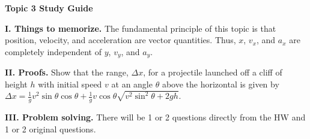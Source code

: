 \documentclass[11pt]{article}
\begin{document}
{\centering
\textbf{Topic 3 Study Guide} \par
\vspace{\baselineskip}
}

\textbf{I. Things to memorize.}
The fundamental principle of this topic is that position, velocity, and acceleration are vector quantities.
Thus, $x$, $v_x$, and $a_x$ are completely independent of $y$, $v_y$, and $a_y$.


\vspace{\baselineskip}
\textbf{II. Proofs.}
Show that the range, $\Delta x$, for a projectile launched off a cliff of height $h$ with initial speed $v$ at an angle $\theta$ above the horizontal is given by
$\Delta x = \frac{1}{g} v^2 \sin\theta \cos\theta + \frac{1}{g} v \cos\theta \sqrt{v^2 \sin^2\theta + 2gh}$.


\vspace{\baselineskip}
\textbf{III. Problem solving.}
There will be 1 or 2 questions directly from the HW and 1 or 2 original questions.
\end{document}
